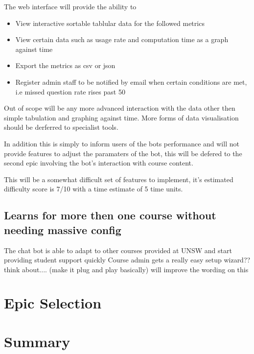 \documentclass{article}
\begin{document}
The web interface will provide the ability to 
\begin{itemize}
  \item View interactive sortable tablular data for the followed metrics
  \item View certain data such as usage rate and computation time as a graph against time
  \item Export the metrics as csv or json
  \item Register admin staff to be notified by email when certain conditions are met, i.e missed question rate rises past 50%
\end{itemize}

Out of scope will be any more advanced interaction with the data other then simple tabulation and graphing against time. More forms of data visualisation should be derferred to specialist tools. 

In addition this is simply to inform users of the bots performance and will not provide features to adjust the paramaters of the bot, this will be defered to the second epic involving the bot's interaction with course content. 

This will be a somewhat difficult set of features to implement, it's estimated difficulty score is 7/10 with a time estimate of 5 time units.

\subsection{Learns for more then one course without needing massive config}
The chat bot is able to adapt to other courses provided at UNSW and start providing student support quickly 
Course admin gets a really easy setup wizard?? think about.... 
(make it plug and play basically)   will improve the wording on this


\section{Epic Selection}

\section{Summary}
\end{document}
